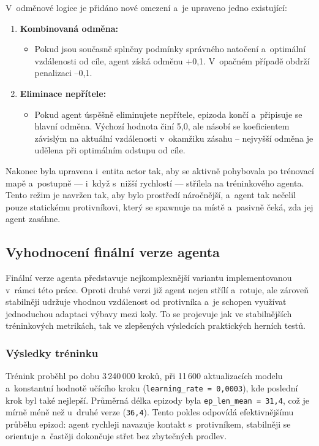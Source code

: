 V~odměnové logice je přidáno nové omezení a~je upraveno jedno existující:

\begin{enumerate}
\item \textbf{Kombinovaná odměna:}
\begin{itemize}
\item Pokud jsou současně splněny podmínky správného natočení a~optimální vzdálenosti od cíle, agent získá odměnu +0{,}1. V~opačném případě obdrží penalizaci –0{,}1.
\end{itemize}

\item \textbf{Eliminace nepřítele:}
\begin{itemize}
\item Pokud agent úspěšně eliminujete nepřítele, epizoda končí a~připisuje se hlavní odměna. Výchozí hodnota činí 5{,}0, ale násobí se koeficientem závislým na aktuální vzdálenosti v~okamžiku zásahu – nejvyšší odměna je udělena při optimálním odstupu od cíle.
\end{itemize}
\end{enumerate}

Nakonec byla upravena i~entita actor  tak, aby se aktivně pohybovala po trénovací mapě a~postupně — i~když s~nižší rychlostí — střílela na tréninkového agenta. Tento režim je navržen tak, aby bylo prostředí náročnější, a~agent tak nečelil pouze statickému protivníkovi, který se spawnuje na místě a~pasivně čeká, zda jej agent zasáhne.

\newpage

\subsection{Vyhodnocení finální verze agenta}

Finální verze agenta představuje nejkomplexnější variantu implementovanou v~rámci této práce. Oproti druhé verzi již agent nejen střílí a~rotuje, ale zároveň stabilněji udržuje vhodnou vzdálenost od protivníka a~je schopen využívat jednoduchou adaptaci výbavy mezi koly. To se projevuje jak ve stabilnějších tréninkových metrikách, tak ve zlepšených výsledcích praktických herních testů.

\subsubsection{Výsledky tréninku}

Trénink proběhl po dobu 3\,240\,000 kroků, při 11\,600 aktualizacích modelu a~konstantní hodnotě učícího kroku (\texttt{learning\_rate = 0{,}0003}), kde poslední krok byl také nejlepší. Průměrná délka epizody byla \texttt{ep\_len\_mean = 31{,}4}, což je mírně méně než u~druhé verze (\texttt{36{,}4}). Tento pokles odpovídá efektivnějšímu průběhu epizod: agent rychleji navazuje kontakt s~protivníkem, stabilněji se orientuje a~častěji dokončuje střet bez zbytečných prodlev.

